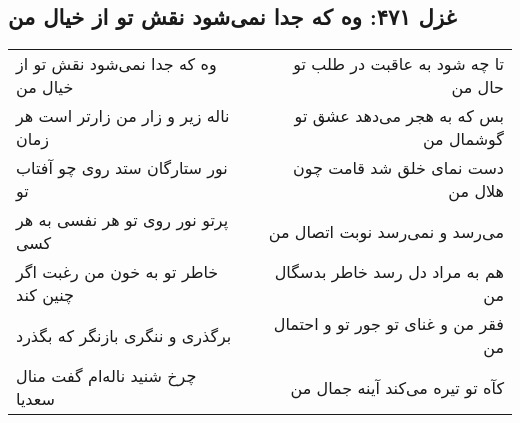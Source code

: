 \begin{center}
\section*{غزل ۴۷۱: وه که جدا نمی‌شود نقش تو از خیال من}
\label{sec:471}
\begin{longtable}{l p{0.5cm} r}
وه که جدا نمی‌شود نقش تو از خیال من
&&
تا چه شود به عاقبت در طلب تو حال من
\\
ناله زیر و زار من زارتر است هر زمان
&&
بس که به هجر می‌دهد عشق تو گوشمال من
\\
نور ستارگان ستد روی چو آفتاب تو
&&
دست نمای خلق شد قامت چون هلال من
\\
پرتو نور روی تو هر نفسی به هر کسی
&&
می‌رسد و نمی‌رسد نوبت اتصال من
\\
خاطر تو به خون من رغبت اگر چنین کند
&&
هم به مراد دل رسد خاطر بدسگال من
\\
برگذری و ننگری بازنگر که بگذرد
&&
فقر من و غنای تو جور تو و احتمال من
\\
چرخ شنید ناله‌ام گفت منال سعدیا
&&
کآه تو تیره می‌کند آینه جمال من
\\
\end{longtable}
\end{center}
